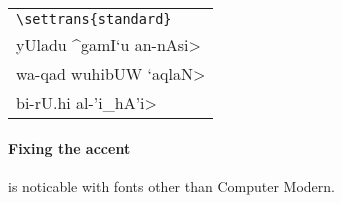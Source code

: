\documentclass[10pt,a4paper]{article}
\newcommand{\phon}[1]{{\showfalse\arabfalse\transtrue\<#1>\/}}
\begin{document}
\medskip

\begin{tabular}{l}
\lstinline|\settrans{standard}| \\[6pt]
\<yUladu ^gamI`u an-nAsi>       \\
\<wa-qad wuhibUW `aqlaN>        \\
\<bi-rU.hi al-'i_hA'i>          \\
\end{tabular}

\paragraph{Fixing the \protect\phon{_h} accent}
is noticable with fonts other than Computer Modern.
\end{document}
